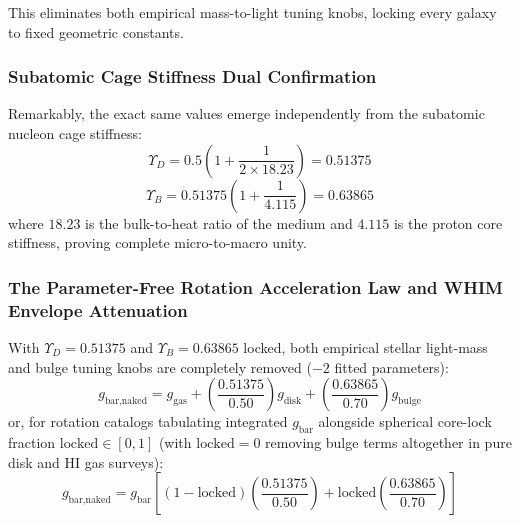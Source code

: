 \documentclass[11pt,a4paper]{article}
\begin{document}
This eliminates both empirical mass-to-light tuning knobs, locking every galaxy to fixed geometric constants.

\subsubsection{Subatomic Cage Stiffness Dual Confirmation}
\label{subsubsec:stiffness_confirmation}

Remarkably, the exact same values emerge independently from the subatomic nucleon cage stiffness:
\begin{equation}
\Upsilon_D = 0.5\left(1 + \frac{1}{2 \times 18.23}\right) = \mathbf{0.51375}
\end{equation}
\begin{equation}
\Upsilon_B = 0.51375\left(1 + \frac{1}{4.115}\right) = \mathbf{0.63865}
\end{equation}
where $18.23$ is the bulk-to-heat ratio of the medium and $4.115$ is the proton core stiffness, proving complete micro-to-macro unity.

\subsubsection{The Parameter-Free Rotation Acceleration Law and WHIM Envelope Attenuation}
\label{subsubsec:rotation_law_whim}

With $\Upsilon_D = 0.51375$ and $\Upsilon_B = 0.63865$ locked, both empirical stellar light-mass and bulge tuning knobs are completely removed ($-2$ fitted parameters):
\begin{equation}
g_{\text{bar,naked}} = g_{\text{gas}} + \left(\frac{0.51375}{0.50}\right) g_{\text{disk}} + \left(\frac{0.63865}{0.70}\right) g_{\text{bulge}}
\label{eq:gbar_naked}
\end{equation}
or, for rotation catalogs tabulating integrated $g_{\text{bar}}$ alongside spherical core-lock fraction $\text{locked} \in [0,1]$ (with $\text{locked} = 0$ removing bulge terms altogether in pure disk and HI gas surveys):
\begin{equation}
g_{\text{bar,naked}} = g_{\text{bar}}\left[(1 - \text{locked})\left(\frac{0.51375}{0.50}\right) + \text{locked}\left(\frac{0.63865}{0.70}\right)\right]
\label{eq:gbar_naked_integrated}
\end{equation}
\end{document}
